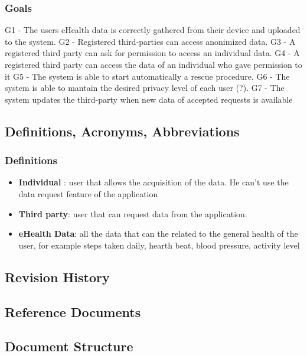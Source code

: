 \documentclass[a4paper,12pt]{article}
\begin{document}
\subsubsection{Goals}
G1 - The users eHealth data is  correctly gathered from their device and uploaded to the system.
 \newline
G2 - Registered third-parties can access anonimized data.
 \newline
G3 - A registered third party can ask for permission to access an individual data.
 \newline
G4 - A registered third party can access the data of an individual who gave permission to it
 \newline
G5 - The system is able to start automatically a rescue procedure.
 \newline
G6 - The system is able to mantain the desired privacy level of each user (?).
 \newline
G7 - The system updates the third-party when new data of accepted requests is available
\subsection{Definitions, Acronyms, Abbreviations}
\subsubsection{Definitions}
\begin{itemize}
\item \textbf{Individual} : user that allows the acquisition of the data. He can't use the data request feature of the application
\item \textbf{Third party}: user that can request data from the application.
\item \textbf{eHealth Data}: all the data that can the related to the general health of the user, for example steps taken daily, hearth beat, blood pressure, activity level
\end{itemize}
\subsection{Revision History}
\subsection{Reference Documents}
\subsection{Document Structure}
\pagebreak

\end{document}

